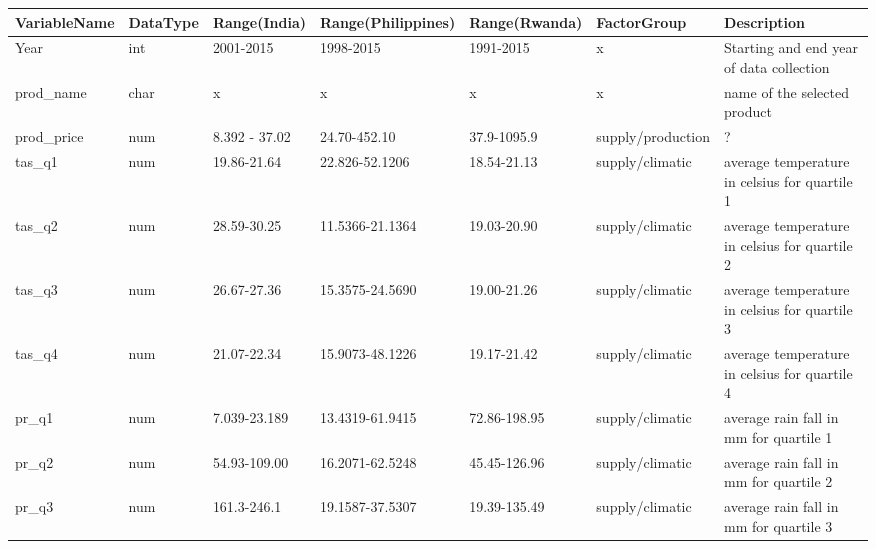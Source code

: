 \documentclass[12pt,a4paper,english]{article}
\begin{document}
\begin{table}[!htbp]
\centering
\begin{adjustbox}{max width=\textwidth}

\begin{tabular}{lllllll}
\hline
VariableName           & DataType & Range(India)        & Range(Philippines)  & Range(Rwanda)       & FactorGroup          & Description                                              \\ \hline
Year                   & int      & 2001-2015           & 1998-2015           & 1991-2015           & x                    & Starting and end year of data collection                 \\
prod\_name             & char     & x                   & x                   & x                   & x                    & name of the selected product                             \\
prod\_price            & num      & 8.392 - 37.02       & 24.70-452.10        & 37.9-1095.9         & supply/production    & ?                                                        \\
tas\_q1                & num      & 19.86-21.64         & 22.826-52.1206      & 18.54-21.13         & supply/climatic      & average temperature in celsius for quartile 1            \\
tas\_q2                & num      & 28.59-30.25         & 11.5366-21.1364     & 19.03-20.90         & supply/climatic      & average temperature in celsius for quartile 2            \\
tas\_q3                & num      & 26.67-27.36         & 15.3575-24.5690     & 19.00-21.26         & supply/climatic      & average temperature in celsius for quartile 3            \\
tas\_q4                & num      & 21.07-22.34         & 15.9073-48.1226     & 19.17-21.42         & supply/climatic      & average temperature in celsius for quartile 4            \\
pr\_q1                 & num      & 7.039-23.189        & 13.4319-61.9415     & 72.86-198.95        & supply/climatic      & average rain fall in mm for quartile 1                   \\
pr\_q2                 & num      & 54.93-109.00        & 16.2071-62.5248     & 45.45-126.96        & supply/climatic      & average rain fall in mm for quartile 2                   \\
pr\_q3                 & num      & 161.3-246.1         & 19.1587-37.5307     & 19.39-135.49        & supply/climatic      & average rain fall in mm for quartile 3                   \\

\end{tabular}
\end{adjustbox}
\end{table}
\end{document}
